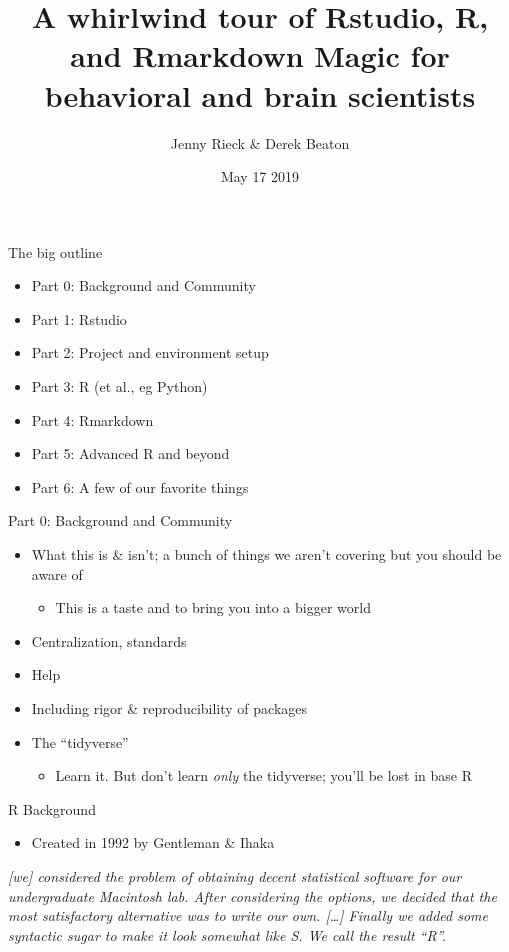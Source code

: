 \documentclass[
  ignorenonframetext,
]{beamer}
\title{A whirlwind tour of Rstudio, R, and Rmarkdown Magic for behavioral and
brain scientists}
\author{Jenny Rieck \& Derek Beaton}
\date{May 17 2019}
\providecommand{\tightlist}{%
  \setlength{\itemsep}{0pt}\setlength{\parskip}{0pt}}
\begin{document}
\frame{\titlepage}

\begin{frame}{The big outline}
\protect\hypertarget{the-big-outline}{}

\begin{itemize}
\tightlist
\item
  Part 0: Background and Community
\item
  Part 1: Rstudio
\item
  Part 2: Project and environment setup
\item
  Part 3: R (et al., eg Python)
\item
  Part 4: Rmarkdown
\item
  Part 5: Advanced R and beyond
\item
  Part 6: A few of our favorite things
\end{itemize}

\end{frame}

\begin{frame}{Part 0: Background and Community}
\protect\hypertarget{part-0-background-and-community}{}

\begin{itemize}
\tightlist
\item
  What this is \& isn't; a bunch of things we aren't covering but you
  should be aware of

  \begin{itemize}
  \tightlist
  \item
    This is a taste and to bring you into a bigger world
  \end{itemize}
\item
  Centralization, standards
\item
  Help
\item
  Including rigor \& reproducibility of packages
\item
  The ``tidyverse''

  \begin{itemize}
  \tightlist
  \item
    Learn it. But don't learn \emph{only} the tidyverse; you'll be lost
    in base R
  \end{itemize}
\end{itemize}

\end{frame}

\begin{frame}{R Background}
\protect\hypertarget{r-background}{}

\begin{itemize}
\tightlist
\item
  Created in 1992 by Gentleman \& Ihaka
\end{itemize}

\emph{{[}we{]} considered the problem of obtaining decent statistical
software for our undergraduate Macintosh lab. After considering the
options, we decided that the most satisfactory alternative was to write
our own. {[}\ldots{}{]} Finally we added some syntactic sugar to make it
look somewhat like S. We call the result ``R''.}

\end{frame}
\end{document}
